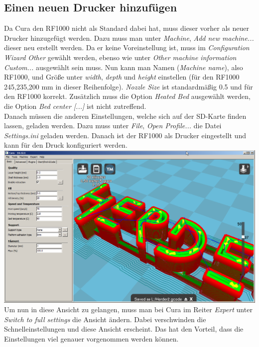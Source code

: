 \documentclass[11pt,a4paper]{scrartcl}
\begin{document}
\subsection*{Einen neuen Drucker hinzufügen}
Da Cura den RF1000 nicht als Standard dabei hat, muss dieser vorher als neuer Drucker hinzugefügt werden. Dazu muss man unter \textit{Machine}, \textit{Add new machine...} dieser neu erstellt werden. Da er keine Voreinstellung ist, muss im \textit{Configuration Wizard} \textit{Other} gewählt werden, ebenso wie unter \textit{Other machine information} \textit{Custom...} ausgewählt sein muss. Nun kann man Namen (\textit{Machine name}), also RF1000, und Größe unter \textit{width}, \textit{depth} und \textit{height} einstellen (für den RF1000 245,235,200 mm in dieser Reihenfolge). \textit{Nozzle Size} ist standardmäßig 0.5 und für den RF1000 korrekt. Zusätzlich muss die Option \textit{Heated Bed} ausgewählt werden, die Option \textit{Bed center [...]} ist nicht zutreffend.\\
Danach müssen die anderen Einstellungen, welche sich auf der SD-Karte finden lassen, geladen werden. Dazu muss unter \textit{File}, \textit{Open Profile...} die Datei \textit{Settings.ini} geladen werden. Danach ist der RF1000 als Drucker eingestellt und kann für den Druck konfiguriert werden.\\
\includegraphics[scale=0.38]{res/Cura-window.png}\\

Um nun in diese Ansicht zu gelangen, muss man bei Cura im Reiter \textit{Expert} unter \textit{Switch to full settings} die Ansicht ändern. Dabei verschwinden die Schnelleinstellungen und diese Ansicht erscheint. Das hat den Vorteil, dass die Einstellungen viel genauer vorgenommen werden können.\\
\end{document}
